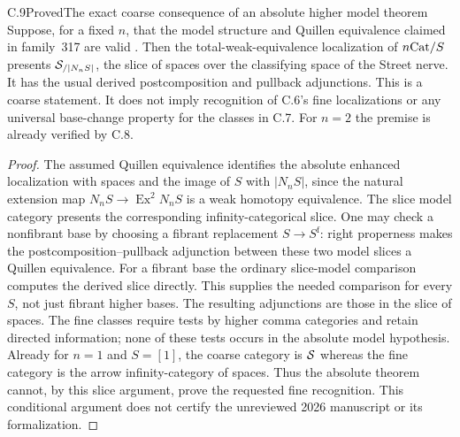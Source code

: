 \begin{claim}{C.9}{Proved}{The exact coarse consequence of an absolute higher model theorem}
Suppose, for a fixed $n$, that the model structure and Quillen equivalence
claimed in family~317 are valid \citep[claimed, unrefereed]{OpenAI2026Thomason}. Then the total-weak-equivalence
localization of $n\mathrm{Cat}/S$ presents $\mathcal S_{/|N_nS|}$, the slice of
spaces over the classifying space of the Street nerve. It has the usual
derived postcomposition and pullback adjunctions. This is a coarse
statement. It does not imply recognition of C.6's fine localizations or
any universal base-change property for the classes in C.7.
For $n=2$ the premise is already verified by C.8.
\end{claim}
\begin{proof}
The assumed Quillen equivalence identifies the absolute enhanced
localization with spaces and the image of $S$ with $|N_nS|$, since the
natural extension map $N_nS\to\operatorname{Ex}^2N_nS$ is a weak
homotopy equivalence. The slice model category presents the corresponding
infinity-categorical slice. One may check a nonfibrant base by choosing a
fibrant replacement $S\to S^{\mathrm f}$: right properness makes the
postcomposition--pullback adjunction between these two model slices a
Quillen equivalence. For a fibrant base the ordinary slice-model
comparison computes the derived slice directly. This supplies the needed
comparison for every $S$, not just fibrant higher bases.
The resulting adjunctions are those in the slice of spaces. The fine
classes require tests by higher comma categories and retain directed
information; none of these tests occurs in the absolute model hypothesis.
Already for $n=1$ and $S=[1]$, the coarse category is $\mathcal S$ whereas
the fine category is the arrow infinity-category of spaces. Thus the
absolute theorem cannot, by this slice argument, prove the requested fine
recognition. This conditional argument does not certify the unreviewed
2026 manuscript or its formalization.
\end{proof}


